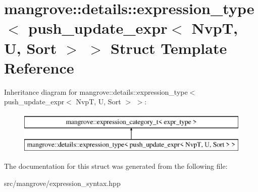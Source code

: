 \hypertarget{structmangrove_1_1details_1_1expression__type_3_01push__update__expr_3_01NvpT_00_01U_00_01Sort_01_4_01_4}{}\section{mangrove\+:\+:details\+:\+:expression\+\_\+type$<$ push\+\_\+update\+\_\+expr$<$ NvpT, U, Sort $>$ $>$ Struct Template Reference}
\label{structmangrove_1_1details_1_1expression__type_3_01push__update__expr_3_01NvpT_00_01U_00_01Sort_01_4_01_4}
Inheritance diagram for mangrove\+:\+:details\+:\+:expression\+\_\+type$<$ push\+\_\+update\+\_\+expr$<$ NvpT, U, Sort $>$ $>$\+:\begin{figure}[H]
\begin{center}
\leavevmode
\includegraphics[height=2.000000cm]{structmangrove_1_1details_1_1expression__type_3_01push__update__expr_3_01NvpT_00_01U_00_01Sort_01_4_01_4}
\end{center}
\end{figure}


The documentation for this struct was generated from the following file\+:\begin{DoxyCompactItemize}
\item 
src/mangrove/expression\+\_\+syntax.\+hpp\end{DoxyCompactItemize}
